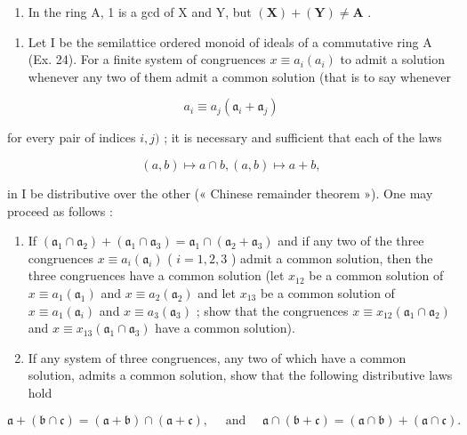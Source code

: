 \begin{enumerate}
\def\labelenumi{\alph{enumi})}
\setcounter{enumi}{1}
\tightlist
\item
  In the ring A, 1 is a gcd of X and Y, but \((\mathbf{X}) + (\mathbf{Y}) \neq \mathbf{A}\) .
\end{enumerate}

\begin{enumerate}
\def\labelenumi{\arabic{enumi})}
\setcounter{enumi}{24}
\tightlist
\item
  Let I be the semilattice ordered monoid of ideals of a commutative ring A (Ex. 24). For a finite system of congruences \(x \equiv a_i(a_i)\) to admit a solution whenever any two of them admit a common solution (that is to say whenever
\end{enumerate}

\[
a _ {i} \equiv a _ {j} (\mathfrak {a} _ {i} + \mathfrak {a} _ {j})
\]

for every pair of indices \(i, j)\) ; it is necessary and sufficient that each of the laws

\[
(a, b) \mapsto a \cap b, (a, b) \mapsto a + b,
\]

in I be distributive over the other (« Chinese remainder theorem »). One may proceed as follows :

\begin{enumerate}
\def\labelenumi{\alph{enumi})}
\item
  If \((\mathfrak{a}_1 \cap \mathfrak{a}_2) + (\mathfrak{a}_1 \cap \mathfrak{a}_3) = \mathfrak{a}_1 \cap (\mathfrak{a}_2 + \mathfrak{a}_3)\) and if any two of the three congruences \(x \equiv a_i(\mathfrak{a}_i)\) ( \(i = 1, 2, 3\) ) admit a common solution, then the three congruences have a common solution (let \(x_{12}\) be a common solution of \(x \equiv a_1(\mathfrak{a}_1)\) and \(x \equiv a_2(\mathfrak{a}_2)\) and let \(x_{13}\) be a common solution of \(x \equiv a_1(\mathfrak{a}_i)\) and \(x \equiv a_3(\mathfrak{a}_3)\) ; show that the congruences \(x \equiv x_{12}(\mathfrak{a}_1 \cap \mathfrak{a}_2)\) and \(x \equiv x_{13}(\mathfrak{a}_1 \cap \mathfrak{a}_3)\) have a common solution).
\item
  If any system of three congruences, any two of which have a common solution, admits a common solution, show that the following distributive laws hold
\end{enumerate}

\[
\mathfrak {a} + (\mathfrak {b} \cap \mathfrak {c}) = (\mathfrak {a} + \mathfrak {b}) \cap (\mathfrak {a} + \mathfrak {c}), \quad \text { and } \quad \mathfrak {a} \cap (\mathfrak {b} + \mathfrak {c}) = (\mathfrak {a} \cap \mathfrak {b}) + (\mathfrak {a} \cap \mathfrak {c}).
\]

